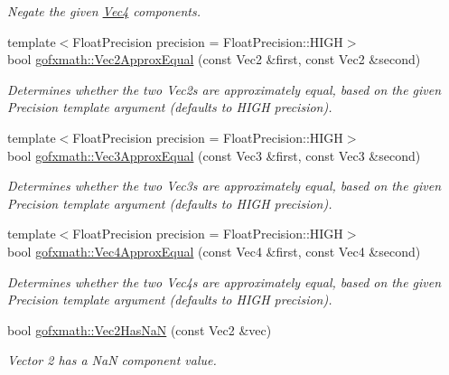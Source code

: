 \begin{DoxyCompactItemize}
\begin{DoxyCompactList}\small\item\em Negate the given \hyperlink{classgofxmath_1_1_vec4}{Vec4} components. \end{DoxyCompactList}\item 
{\footnotesize template$<$Float\+Precision precision = Float\+Precision\+::\+H\+I\+G\+H$>$ }\\bool \hyperlink{group___s_i_s_d_vec_math_gae2e5df24e56917013fefa17579bb8749}{gofxmath\+::\+Vec2\+Approx\+Equal} (const Vec2 \&first, const Vec2 \&second)
\begin{DoxyCompactList}\small\item\em Determines whether the two Vec2s are approximately equal, based on the given Precision template argument (defaults to H\+I\+G\+H precision). \end{DoxyCompactList}\item 
{\footnotesize template$<$Float\+Precision precision = Float\+Precision\+::\+H\+I\+G\+H$>$ }\\bool \hyperlink{group___s_i_s_d_vec_math_gac042c4407bfaa66715e3c4b5b0a839f4}{gofxmath\+::\+Vec3\+Approx\+Equal} (const Vec3 \&first, const Vec3 \&second)
\begin{DoxyCompactList}\small\item\em Determines whether the two Vec3s are approximately equal, based on the given Precision template argument (defaults to H\+I\+G\+H precision). \end{DoxyCompactList}\item 
{\footnotesize template$<$Float\+Precision precision = Float\+Precision\+::\+H\+I\+G\+H$>$ }\\bool \hyperlink{group___s_i_s_d_vec_math_ga819b8c958e12f0838288c641af7e1ab6}{gofxmath\+::\+Vec4\+Approx\+Equal} (const Vec4 \&first, const Vec4 \&second)
\begin{DoxyCompactList}\small\item\em Determines whether the two Vec4s are approximately equal, based on the given Precision template argument (defaults to H\+I\+G\+H precision). \end{DoxyCompactList}\item 
bool \hyperlink{group___s_i_s_d_vec_math_ga7b340b1e4dd88d99aba27f41cd0c1d17}{gofxmath\+::\+Vec2\+Has\+Na\+N} (const Vec2 \&vec)
\begin{DoxyCompactList}\small\item\em Vector 2 has a Na\+N component value. \end{DoxyCompactList}\item 

\end{DoxyCompactItemize}
